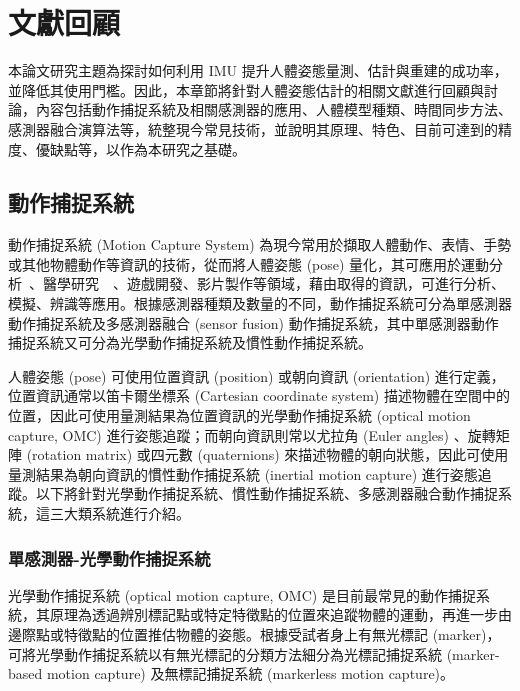 \chapter{文獻回顧}
\fontsize{12pt}{18pt}\selectfont %

本論文研究主題為探討如何利用 IMU 提升人體姿態量測、估計與重建的成功率，並降低其使用門檻。因此，本章節將針對人體姿態估計的相關文獻進行回顧與討論，內容包括動作捕捉系統及相關感測器的應用、人體模型種類、時間同步方法、感測器融合演算法等，統整現今常見技術，並說明其原理、特色、目前可達到的精度、優缺點等，以作為本研究之基礎。

\section{動作捕捉系統}
動作捕捉系統 (Motion Capture System) 為現今常用於擷取人體動作、表情、手勢或其他物體動作等資訊的技術，從而將人體姿態 (pose) 量化，其可應用於運動分析~\cite{armitano2022swot}、醫學研究~\cite{alarcon2020upper}~\cite{gu2023imu}、遊戲開發、影片製作等領域，藉由取得的資訊，可進行分析、模擬、辨識等應用。根據感測器種類及數量的不同，動作捕捉系統可分為單感測器動作捕捉系統及多感測器融合 (sensor fusion) 動作捕捉系統，其中單感測器動作捕捉系統又可分為光學動作捕捉系統及慣性動作捕捉系統。 

人體姿態 (pose) 可使用位置資訊 (position) 或朝向資訊 (orientation) 進行定義，位置資訊通常以笛卡爾坐標系 (Cartesian coordinate system) 描述物體在空間中的位置，因此可使用量測結果為位置資訊的光學動作捕捉系統 (optical motion capture, OMC) 進行姿態追蹤；而朝向資訊則常以尤拉角 (Euler angles) 、旋轉矩陣 (rotation matrix) 或四元數 (quaternions) 來描述物體的朝向狀態，因此可使用量測結果為朝向資訊的慣性動作捕捉系統 (inertial motion capture) 進行姿態追蹤。以下將針對光學動作捕捉系統、慣性動作捕捉系統、多感測器融合動作捕捉系統，這三大類系統進行介紹。

\subsection{單感測器-光學動作捕捉系統}
光學動作捕捉系統 (optical motion capture, OMC) 是目前最常見的動作捕捉系統，其原理為透過辨別標記點或特定特徵點的位置來追蹤物體的運動，再進一步由邊際點或特徵點的位置推估物體的姿態。根據受試者身上有無光標記 (marker)，可將光學動作捕捉系統以有無光標記的分類方法細分為光標記捕捉系統 (marker-based motion capture) 及無標記捕捉系統 (markerless motion capture)。

